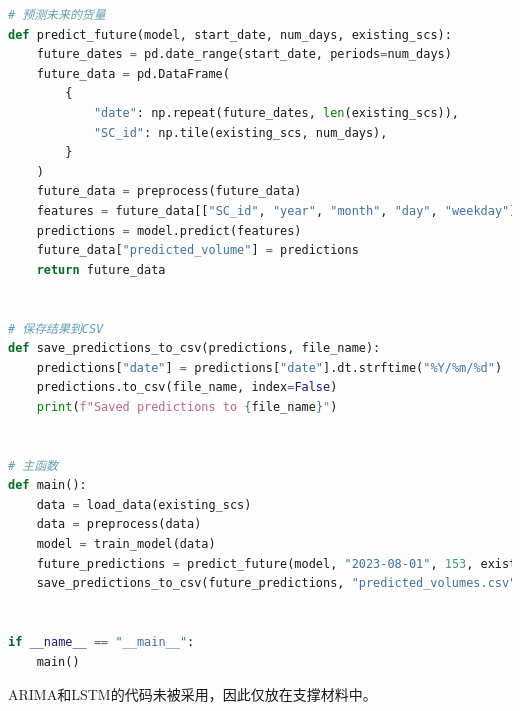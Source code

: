 \documentclass[UTF8,a4paper,10 pt]{article}%
\begin{document}
\begin{lstlisting}[language=python]
# 预测未来的货量
def predict_future(model, start_date, num_days, existing_scs):
    future_dates = pd.date_range(start_date, periods=num_days)
    future_data = pd.DataFrame(
        {
            "date": np.repeat(future_dates, len(existing_scs)),
            "SC_id": np.tile(existing_scs, num_days),
        }
    )
    future_data = preprocess(future_data)
    features = future_data[["SC_id", "year", "month", "day", "weekday"]]
    predictions = model.predict(features)
    future_data["predicted_volume"] = predictions
    return future_data


# 保存结果到CSV
def save_predictions_to_csv(predictions, file_name):
    predictions["date"] = predictions["date"].dt.strftime("%Y/%m/%d")
    predictions.to_csv(file_name, index=False)
    print(f"Saved predictions to {file_name}")


# 主函数
def main():
    data = load_data(existing_scs)
    data = preprocess(data)
    model = train_model(data)
    future_predictions = predict_future(model, "2023-08-01", 153, existing_scs)
    save_predictions_to_csv(future_predictions, "predicted_volumes.csv")


if __name__ == "__main__":
    main()
\end{lstlisting}
ARIMA和LSTM的代码未被采用，因此仅放在支撑材料中。
\end{document}
